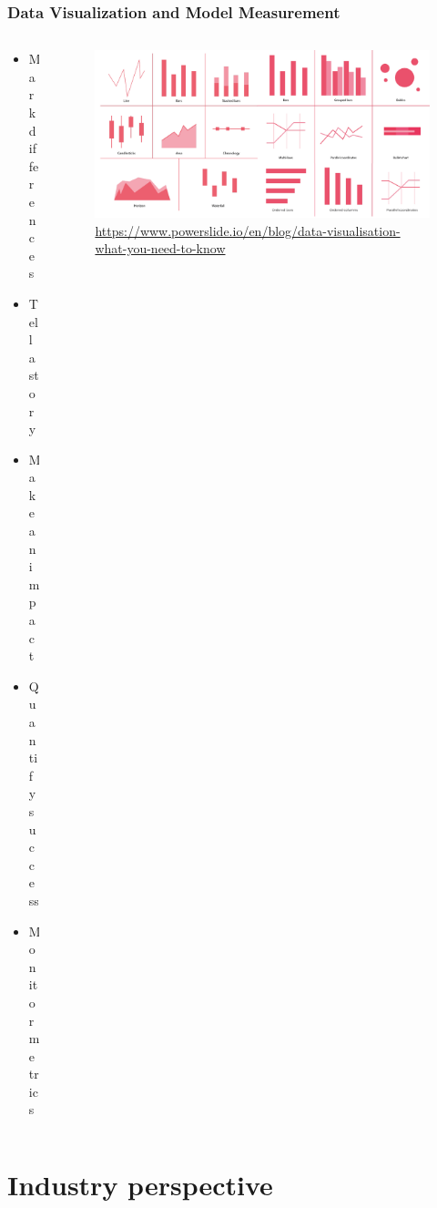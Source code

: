 \documentclass[aspectratio=169,xcolor=x11names,table]{beamer}
\begin{document}
\begin{frame}
	\frametitle{Data Visualization and Model Measurement}
	\begin{columns}
		\begin{column}{0.3\linewidth}
			\begin{itemize}
				\item Mark differences
					\vspace{5mm}
				\item Tell a story
					\vspace{5mm}
				\item Make an impact
					\vspace{5mm}
				\item Quantify success
					\vspace{5mm}
				\item Monitor metrics
			\end{itemize}
		\end{column}
		\hfill
		\begin{column}{0.7\linewidth}
			\begin{figure}
				\centering
				\includegraphics[width=\columnwidth]{data_visualization}
				\tiny \url{https://www.powerslide.io/en/blog/data-visualisation-what-you-need-to-know}
			\end{figure}
		\end{column}
	\end{columns}
\end{frame}


\section{Industry perspective}
\end{document}
